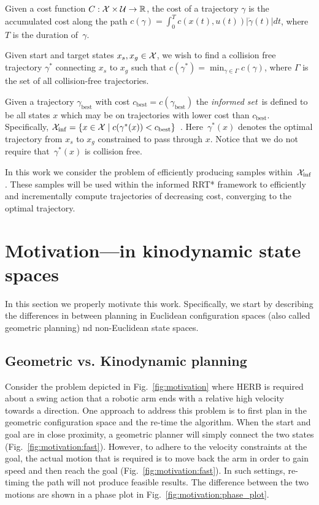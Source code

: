 \documentclass[letterpaper, 10 pt, conference]{ieeeconf}  %
\begin{document}
Given a cost function $C : \mathcal{X} \times \mathcal{U} \rightarrow \mathbb{R}$, the cost of a trajectory $ \gamma $ is the accumulated cost along the path
$c(\gamma) = \int_0^{T} c( x(t), u(t) ) |\dot{\gamma}(t)|dt$, 
where $T$ is the duration of~$\gamma$.

Given start and target states $x_s, x_g \in \mathcal{X}$, we wish to find a collision free trajectory $\gamma^*$ connecting $x_s$ to $x_g$ such that 
$c(\gamma^*) = \min_{\gamma \in \Gamma} c(\gamma)$, where $\Gamma$ is the set of all collision-free trajectories.

Given a trajectory $\gamma_{\text{best}}$ with cost $c_{\text{best}} = c(\gamma_{\text{best}})$ the \emph{informed set}~\Cinf is defined to be all states $x$  which may be on trajectories with lower cost than $c_{\text{best}}$.
Specifically,
$
\mathcal{X}_{\rm {inf}} = \{ x \in \mathcal{X} \mid  
		c ( \gamma^*(x) ) < c_{\rm best} \} $~\cite{GSB14}.
Here~$ \gamma^*(x) $ denotes the optimal trajectory  from $ x_s $ to $ x_g $ constrained to pass through $ x $.
Notice that we do not require that~$ \gamma^*(x) $ is collision free.

In this work we consider the problem of efficiently producing samples within~$\mathcal{X}_{\rm {inf}}$.
These samples will be used within the informed RRT* framework to efficiently and incrementally compute trajectories of decreasing cost, converging to the optimal trajectory.



\section{Motivation---\Cinf in kinodynamic state spaces}
\label{sec:mtdi}

In this section we properly motivate this work.
Specifically, we start by describing the differences in between planning in Euclidean configuration spaces (also called geometric planning) nd non-Euclidean  state spaces.


\subsection{Geometric vs. Kinodynamic planning}
Consider the problem depicted in Fig.~\ref{fig:motivation} where HERB is required about a swing action that a robotic arm ends with a relative high velocity towards a direction.
One approach to address this problem is to first plan in the geometric configuration space and the re-time the algorithm.
When the start and goal are in close proximity, a geometric planner will simply connect the two states (Fig.~\ref{fig:motivation:fast}).
However, to adhere to the velocity constraints at the goal, the actual motion that is required is to move back the arm in order to gain speed and then reach the goal (Fig.~\ref{fig:motivation:fast}).
In such settings, re-timing the path will not produce feasible results.
The difference between the two motions are shown in a phase plot in Fig.~\ref{fig:motivation:phase_plot}.
\end{document}
